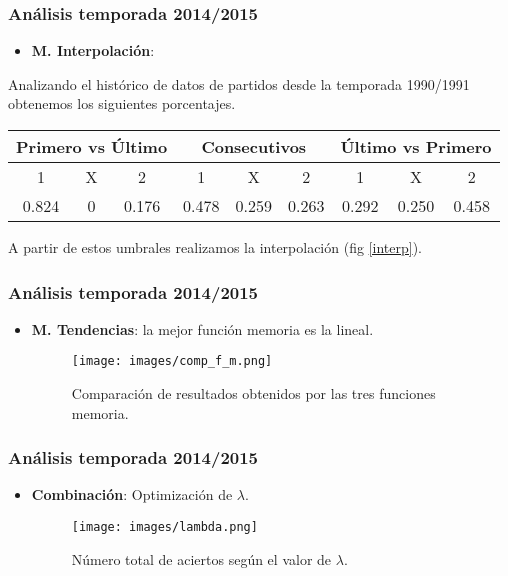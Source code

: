 \documentclass{beamer}
\begin{document}
	\begin{frame}
		\frametitle{Análisis temporada 2014/2015}
		\begin{itemize}
			\item \textbf{M. Interpolación}:
		\end{itemize}
		Analizando el histórico de datos de partidos desde la temporada 1990/1991 obtenemos los siguientes porcentajes.

		\vspace{-7mm}
		\begin{table}[H]
			\centering
			\begin{tabular}{|c|c|c|c|c|c|c|c|c|}
				\hline
				\multicolumn{3}{|c|}{Primero vs Último} & \multicolumn{3}{|c|}{Consecutivos} & \multicolumn{3}{|c|}{Último vs Primero} \\ \hline
				1 & X & 2 & 1 & X & 2 & 1 & X & 2\\ \hline  			
				0.824 & 0 & 0.176 & 0.478 & 0.259 & 0.263 & 0.292 & 0.250 & 0.458 \\ \hline
			\end{tabular}
		\end{table}
		A partir de estos umbrales realizamos la interpolación (fig \ref{interp}).	
	\end{frame}		
	
	\begin{frame}
		\frametitle{Análisis temporada 2014/2015}
		\begin{itemize}
			\item \textbf{M. Tendencias}: la mejor función memoria es la lineal.
			\begin{figure} 
				\centering
				\texttt{[image: images/comp\_f\_m.png]}
				\caption{Comparación de resultados obtenidos por las tres funciones memoria.}
			\end{figure}
		\end{itemize}
	\end{frame}	
	
	\begin{frame}
		\frametitle{Análisis temporada 2014/2015}
		\begin{itemize}
			\item \textbf{Combinación}: Optimización de $\lambda$.
			\begin{figure} 
				\centering
				\texttt{[image: images/lambda.png]}
				\caption{Número total de aciertos según el valor de $\lambda$.}
			\end{figure}
		\end{itemize}
	\end{frame}		
\end{document}

